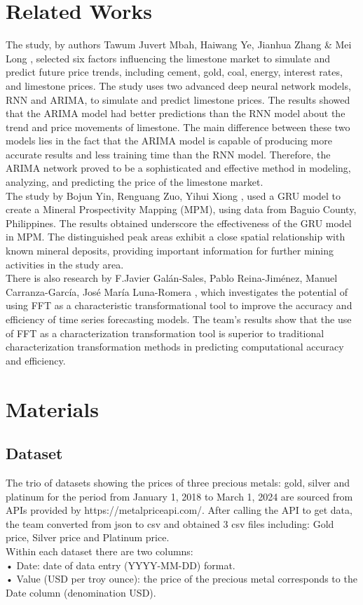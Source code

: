 \documentclass{ieeeojies}
\begin{document}
\section{Related Works}
The study, by authors Tawum Juvert Mbah, Haiwang Ye, Jianhua Zhang & Mei Long \cite{b1}, selected six factors influencing the limestone market to simulate and predict future price trends, including cement, gold, coal, energy, interest rates, and limestone prices. The study uses two advanced deep neural network models, RNN and ARIMA, to simulate and predict limestone prices. The results showed that the ARIMA model had better predictions than the RNN model about the trend and price movements of limestone. The main difference between these two models lies in the fact that the ARIMA model is capable of producing more accurate results and less training time than the RNN model. Therefore, the ARIMA network proved to be a sophisticated and effective method in modeling, analyzing, and predicting the price of the limestone market.\\
The study by Bojun Yin, Renguang Zuo, Yihui Xiong \cite{b2}, used a GRU model to create a Mineral Prospectivity Mapping (MPM), using data from Baguio County, Philippines. The results obtained underscore the effectiveness of the GRU model in MPM. The distinguished peak areas exhibit a close spatial relationship with known mineral deposits, providing important information for further mining activities in the study area.\\
There is also research by F.Javier Galán-Sales, Pablo Reina-Jiménez, Manuel Carranza-García, José María Luna-Romera \cite{b3}, which investigates the potential of using FFT as a characteristic transformational tool to improve the accuracy and efficiency of time series forecasting models. The team's results show that the use of FFT as a characterization transformation tool is superior to traditional characterization transformation methods in predicting computational accuracy and efficiency. 
\\
\section{Materials}
\subsection{Dataset}

The trio of datasets showing the prices of three precious metals: gold, silver and platinum for the period from January 1, 2018 to March 1, 2024 are sourced from APIs provided by https://metalpriceapi.com/.
After calling the API to get data, the team converted from json to csv and obtained 3 csv files including: Gold price, Silver price and Platinum price.\\
Within each dataset there are two columns:\\
• Date: date of data entry (YYYY-MM-DD) format.\\
• Value (USD per troy ounce): the price of the precious metal corresponds to the Date column (denomination USD).
\end{document}
